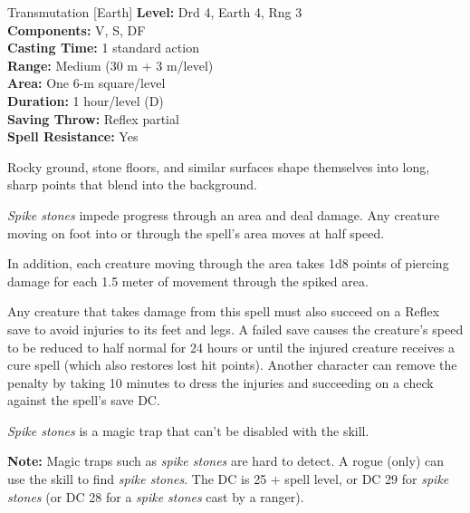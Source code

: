 {Transmutation [Earth]}
{
	\textbf{Level:}
	Drd 4, Earth 4, Rng 3\\
	\textbf{Components:}
	V, S, DF\\
	\textbf{Casting Time:}
	1 standard action\\
	\textbf{Range:}
	Medium (30 m + 3 m/level)\\
	\textbf{Area:}
	One 6-m square/level\\
	\textbf{Duration:}
	1 hour/level (D)\\
	\textbf{Saving Throw:}
	Reflex partial\\
	\textbf{Spell Resistance:}
	Yes\\
}
{
	Rocky ground, stone floors, and similar surfaces shape themselves into long, sharp points that blend into the background.

	\emph{Spike stones} impede progress through an area and deal damage. Any creature moving on foot into or through the spell's area moves at half speed.

	In addition, each creature moving through the area takes 1d8 points of piercing damage for each 1.5 meter of movement through the spiked area.

	Any creature that takes damage from this spell must also succeed on a Reflex save to avoid injuries to its feet and legs. A failed save causes the creature's speed to be reduced to half normal for 24 hours or until the injured creature receives a cure spell (which also restores lost hit points). Another character can remove the penalty by taking 10 minutes to dress the injuries and succeeding on a  check against the spell's save DC.

	\emph{Spike stones} is a magic trap that can't be disabled with the  skill.

	\textbf{Note:} Magic traps such as \emph{spike stones} are hard to detect. A rogue (only) can use the  skill to find \emph{spike stones}. The DC is 25 + spell level, or DC 29 for \emph{spike stones} (or DC 28 for a \emph{spike stones} cast by a ranger).

}
